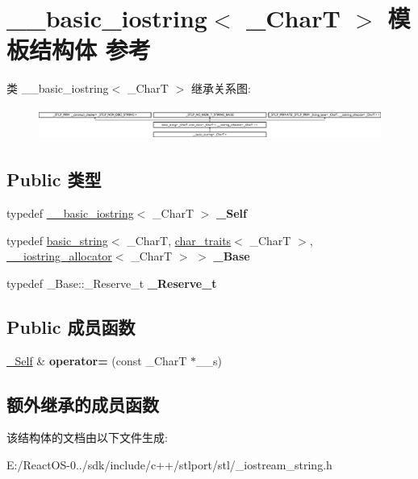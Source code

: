 \hypertarget{struct____basic__iostring}{}\section{\+\_\+\+\_\+basic\+\_\+iostring$<$ \+\_\+\+CharT $>$ 模板结构体 参考}
\label{struct____basic__iostring}
类 \+\_\+\+\_\+basic\+\_\+iostring$<$ \+\_\+\+CharT $>$ 继承关系图\+:\begin{figure}[H]
\begin{center}
\leavevmode
\includegraphics[height=1.068702cm]{struct____basic__iostring}
\end{center}
\end{figure}
\subsection*{Public 类型}
\begin{DoxyCompactItemize}
\item 
\mbox{\label{struct____basic__iostring_a3db30a2249208ca3693d9da1fa442f63}} 
typedef \hyperlink{struct____basic__iostring}{\+\_\+\+\_\+basic\+\_\+iostring}$<$ \+\_\+\+CharT $>$ {\bfseries \+\_\+\+Self}
\item 
\mbox{\label{struct____basic__iostring_a42e94d35c13d9f72da1ca97bbf8973dd}} 
typedef \hyperlink{classbasic__string}{basic\+\_\+string}$<$ \+\_\+\+CharT, \hyperlink{classchar__traits}{char\+\_\+traits}$<$ \+\_\+\+CharT $>$, \hyperlink{class____iostring__allocator}{\+\_\+\+\_\+iostring\+\_\+allocator}$<$ \+\_\+\+CharT $>$ $>$ {\bfseries \+\_\+\+Base}
\item 
\mbox{\label{struct____basic__iostring_ab73e451c1c586e7e7139b2d583c4ce43}} 
typedef \+\_\+\+Base\+::\+\_\+\+Reserve\+\_\+t {\bfseries \+\_\+\+Reserve\+\_\+t}
\end{DoxyCompactItemize}
\subsection*{Public 成员函数}
\begin{DoxyCompactItemize}
\item 
\mbox{\label{struct____basic__iostring_a49c0d7aaa0c69b92b439cec0f1353765}} 
\hyperlink{struct____basic__iostring}{\+\_\+\+Self} \& {\bfseries operator=} (const \+\_\+\+CharT $\ast$\+\_\+\+\_\+s)
\end{DoxyCompactItemize}
\subsection*{额外继承的成员函数}


该结构体的文档由以下文件生成\+:\begin{DoxyCompactItemize}
\item 
E\+:/\+React\+O\+S-\/0../sdk/include/c++/stlport/stl/\+\_\+iostream\+\_\+string.\+h\end{DoxyCompactItemize}
